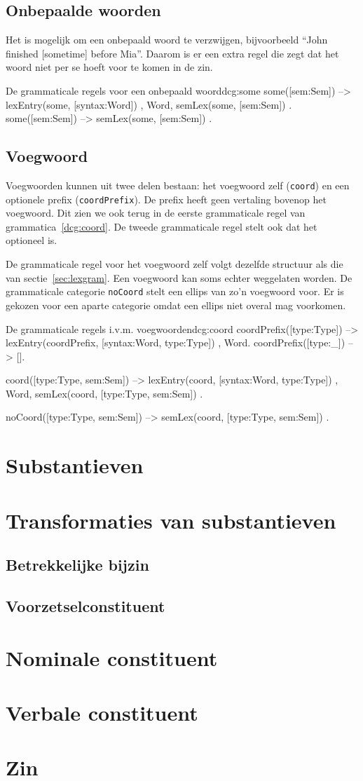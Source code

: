 \subsection{Onbepaalde woorden}
Het is mogelijk om een onbepaald woord te verzwijgen, bijvoorbeeld ``John finished [sometime] before Mia''. Daarom is er een extra regel die zegt dat het woord niet per se hoeft voor te komen in de zin.

\begin{dcg}{De grammaticale regels voor een onbepaald woord}{dcg:some}
some([sem:Sem]) -->
  { lexEntry(some, [syntax:Word]) },
  Word,
  { semLex(some, [sem:Sem]) }.
some([sem:Sem]) -->
  { semLex(some, [sem:Sem]) }.
\end{dcg}

\subsection{Voegwoord}
Voegwoorden kunnen uit twee delen bestaan: het voegwoord zelf (\texttt{coord}) en een optionele prefix (\texttt{coordPrefix}). De prefix heeft geen vertaling bovenop het voegwoord. Dit zien we ook terug in de eerste grammaticale regel van grammatica~\ref{dcg:coord}. De tweede grammaticale regel stelt ook dat het optioneel is.

De grammaticale regel voor het voegwoord zelf volgt dezelfde structuur als die van sectie~\ref{sec:lexgram}. Een voegwoord kan soms echter weggelaten worden. De grammaticale categorie \texttt{noCoord} stelt een ellips van zo'n voegwoord voor. Er is gekozen voor een aparte categorie omdat een ellips niet overal mag voorkomen.
\begin{dcg}{De grammaticale regels i.v.m. voegwoorden}{dcg:coord}
coordPrefix([type:Type]) -->
  { lexEntry(coordPrefix, [syntax:Word, type:Type]) },
  Word.
coordPrefix([type:_]) -->
  [].

coord([type:Type, sem:Sem]) -->
  { lexEntry(coord, [syntax:Word, type:Type]) },
  Word,
  { semLex(coord, [type:Type, sem:Sem]) }.

noCoord([type:Type, sem:Sem]) -->
  { semLex(coord, [type:Type, sem:Sem]) }.
\end{dcg} 

\section{Substantieven}
\section{Transformaties van substantieven}
\subsection{Betrekkelijke bijzin}
\subsection{Voorzetselconstituent}
\section{Nominale constituent}

\section{Verbale constituent}
\section{Zin}
